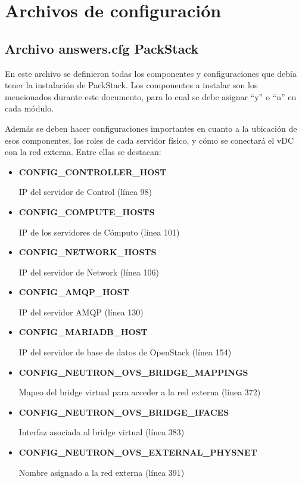 \documentclass[12pt,a4paper,oneside]{book}
\begin{document}
\chapter{Archivos de configuración}


\section{Archivo answers.cfg PackStack}
\label{seccB.1}
En este archivo se definieron todas los componentes y configuraciones que debía tener la instalación de PackStack. Los componentes a instalar son los mencionados durante este documento, para lo cual se debe asignar ``y'' o ``n''
en cada módulo.

\vspace{0.5cm}

Además se deben hacer configuraciones importantes en cuanto a la ubicación de esos componentes, los roles de cada servidor físico, y cómo se conectará el vDC con la red externa. Entre ellas se destacan:
\begin{itemize}
    \item \textbf{CONFIG\_CONTROLLER\_HOST} 
    
    IP del servidor de Control (línea 98)
    \item \textbf{CONFIG\_COMPUTE\_HOSTS} 
    
    IP de los servidores de Cómputo (línea 101)
    \item \textbf{CONFIG\_NETWORK\_HOSTS} 
    
    IP del servidor de Network (línea 106)
    \item \textbf{CONFIG\_AMQP\_HOST} 
    
    IP del servidor AMQP (línea 130)
    \item \textbf{CONFIG\_MARIADB\_HOST} 
    
    IP del servidor de base de datos de OpenStack (línea 154)
    \item \textbf{CONFIG\_NEUTRON\_OVS\_BRIDGE\_MAPPINGS} 
    
    Mapeo del bridge virtual para acceder a la red externa (línea 372)
    \item \textbf{CONFIG\_NEUTRON\_OVS\_BRIDGE\_IFACES} 
    
    Interfaz asociada al bridge virtual (línea 383)
    \item \textbf{CONFIG\_NEUTRON\_OVS\_EXTERNAL\_PHYSNET} 
    
    Nombre asignado a la red externa (línea 391)

\end{itemize}
\end{document}
